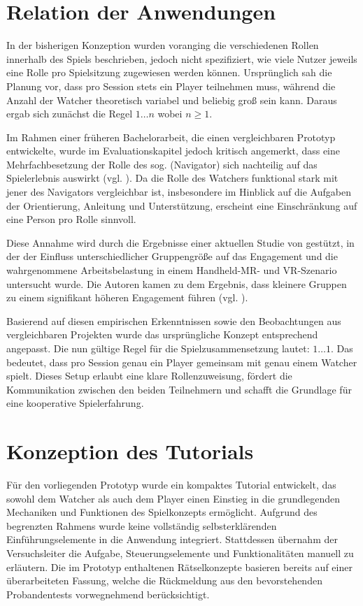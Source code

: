 \section{Relation der Anwendungen}

In der bisherigen Konzeption wurden voranging die verschiedenen Rollen innerhalb des Spiels beschrieben, jedoch nicht spezifiziert, wie viele Nutzer jeweils eine Rolle pro Spielsitzung zugewiesen werden können. Ursprünglich sah die Planung vor, dass pro Session stets ein Player teilnehmen muss, während die Anzahl der Watcher theoretisch variabel und beliebig groß sein kann. Daraus ergab sich zunächst die Regel $1\ldots n$ \quad wobei $n \geq 1$.

Im Rahmen einer früheren Bachelorarbeit, die einen vergleichbaren Prototyp entwickelte, wurde im Evaluationskapitel jedoch kritisch angemerkt, dass eine Mehrfachbesetzung der Rolle des sog.  (Navigator) sich nachteilig auf das Spielerlebnis auswirkt (vgl. \citealp[S. 34]{lotz_konzeption_2021}). Da die Rolle des Watchers funktional stark mit jener des Navigators vergleichbar ist, insbesondere im Hinblick auf die Aufgaben der Orientierung, Anleitung und Unterstützung, erscheint eine Einschränkung auf eine Person pro Rolle sinnvoll.

Diese Annahme wird durch die Ergebnisse einer aktuellen Studie von \cite{bautista_isaza_understanding_2024} gestützt, in der der Einfluss unterschiedlicher Gruppengröße auf das Engagement und die wahrgenommene Arbeitsbelastung in einem Handheld-\ac{MR}- und \ac{VR}-Szenario untersucht wurde. Die Autoren kamen zu dem Ergebnis, dass kleinere Gruppen zu einem signifikant höheren Engagement führen (vgl. \citealp[S. 197:22]{bautista_isaza_understanding_2024}).

Basierend auf diesen empirischen Erkenntnissen sowie den Beobachtungen aus vergleichbaren Projekten wurde das ursprüngliche Konzept entsprechend angepasst. Die nun gültige Regel für die Spielzusammensetzung lautet: $1\ldots1$. Das bedeutet, dass pro Session genau ein Player gemeinsam mit genau einem Watcher spielt. Dieses Setup erlaubt eine klare Rollenzuweisung, fördert die Kommunikation zwischen den beiden Teilnehmern und schafft die Grundlage für eine kooperative Spielerfahrung.

\section{Konzeption des Tutorials}

Für den vorliegenden Prototyp wurde ein kompaktes Tutorial entwickelt, das sowohl dem Watcher als auch dem Player einen Einstieg in die grundlegenden Mechaniken und Funktionen des Spielkonzepts ermöglicht. Aufgrund des begrenzten Rahmens wurde keine vollständig selbsterklärenden Einführungselemente in die Anwendung integriert. Stattdessen übernahm der Versuchsleiter die Aufgabe, Steuerungselemente und Funktionalitäten manuell zu erläutern. Die im Prototyp enthaltenen Rätselkonzepte basieren bereits auf einer überarbeiteten Fassung, welche die Rückmeldung aus den bevorstehenden Probandentests vorwegnehmend berücksichtigt.

